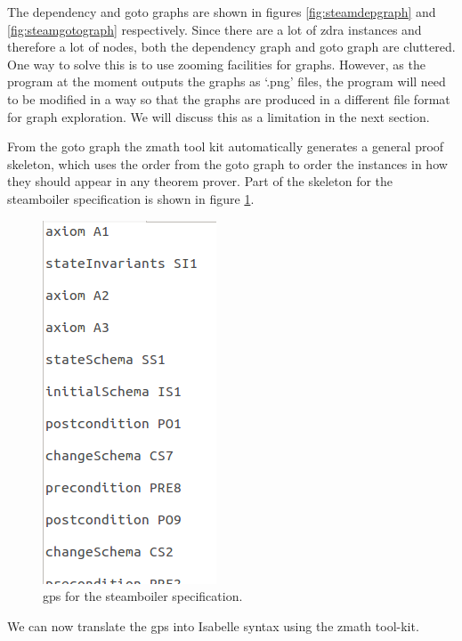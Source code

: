 The dependency and goto graphs are shown in figures \ref{fig:steamdepgraph} and
\ref{fig:steamgotograph} respectively. Since there are a lot of \gls{zdra}
instances and therefore a lot of nodes, both the dependency graph and goto graph
are cluttered. One way to solve this is to use zooming facilities for graphs.
However, as the program at the moment outputs the graphs as `.png' files, the
program will need to be modified in a way so that the graphs are produced in a 
different file format for graph exploration.
 We will discuss this as a limitation in the next section.

From the goto graph the \gls{zmath} tool kit automatically generates a general
proof skeleton, which uses the order from the goto graph to order the instances
in how they should appear in any theorem prover. Part of the skeleton for the
steamboiler specification is shown in figure \ref{fig:steamgpsa}.

\begin{figure}[H]
\includegraphics[scale=0.5]{Figures/Evaluation/steamboilergpsa.png}
\caption{\Gls{gps} for the steamboiler specification. \label{fig:steamgpsa}}
\end{figure}

We can now translate the \gls{gps} into Isabelle syntax using the \gls{zmath}
tool-kit.


